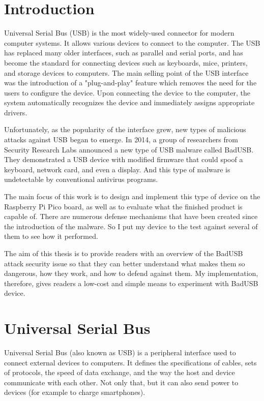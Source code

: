 \chapter{Introduction}
Universal Serial Bus (USB) is the most widely-used connector for modern computer systems. It allows various devices to connect to the computer. The USB has replaced many older interfaces, such as parallel and serial ports, and has become the standard for connecting devices such as keyboards, mice, printers, and storage devices to computers. The main selling point of the USB interface was the introduction of a "plug-and-play" feature which removes the need for the users to configure the device. Upon connecting the device to the computer, the system automatically recognizes the device and immediately assigns appropriate drivers.

Unfortunately, as the popularity of the interface grew, new types of malicious attacks against USB began to emerge. In 2014, a group of researchers from Security Research Labs announced a new type of USB malware called BadUSB. They demonstrated a USB device with modified firmware that could spoof a keyboard, network card, and even a display. And this type of malware is undetectable by conventional antivirus programs.

The main focus of this work is to design and implement this type of device on the Raspberry Pi Pico board, as well as to evaluate what the finished product is capable of. There are numerous defense mechanisms that have been created since the introduction of the malware. So I put my device to the test against several of them to see how it performed.

The aim of this thesis is to provide readers with an overview of the BadUSB attack security issue so that they can better understand what makes them so dangerous, how they work, and how to defend against them. My implementation, therefore, gives readers a low-cost and simple means to experiment with BadUSB device.


\chapter{Universal Serial Bus}
\label{ch:usb}
Universal Serial Bus (also known as USB) is a peripheral interface used to connect external devices to computers. It defines the specifications of cables, sets of protocols, the speed of data exchange, and the way the host and device communicate with each other. Not only that, but it can also send power to devices (for example to charge smartphones).

